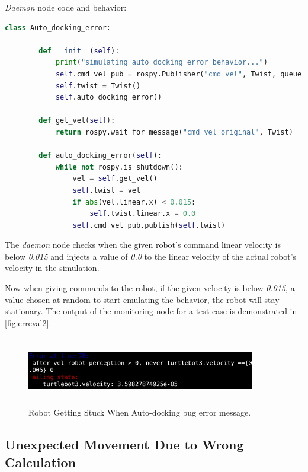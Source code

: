 \textit{Daemon} node code and behavior:

\begin{lstlisting}[language=Python]
    class Auto_docking_error:

        def __init__(self):
            print("simulating auto_docking_error_behavior...")
            self.cmd_vel_pub = rospy.Publisher("cmd_vel", Twist, queue_size=1)
            self.twist = Twist()
            self.auto_docking_error()

        def get_vel(self):
            return rospy.wait_for_message("cmd_vel_original", Twist)

        def auto_docking_error(self):
            while not rospy.is_shutdown():
                vel = self.get_vel()
                self.twist = vel
                if abs(vel.linear.x) < 0.015:
                    self.twist.linear.x = 0.0
                self.cmd_vel_pub.publish(self.twist)
\end{lstlisting}

The \textit{daemon} node checks when the given robot's command linear velocity is below \textit{0.015} and injects a value of \textit{0.0} to the linear velocity of the actual robot's velocity in the simulation.

Now when giving commands to the robot, if the given velocity is below \textit{0.015}, a value chosen at random to start emulating the behavior, the robot will stay stationary. The output of the monitoring node for a test case is demonstrated in \autoref{fig:erreval2}.

\begin{figure}[htb]
\begin{center}
\includegraphics[width=10cm,height=3cm,keepaspectratio,]{images/erreval2.png}
\caption{Robot Getting Stuck When Auto-docking bug error message.} \label{fig:erreval2}
\end{center}
\end{figure}


\subsection{Unexpected Movement Due to Wrong Calculation}
\label{ssec:unexpectedmovementduetowrongcalculation}

